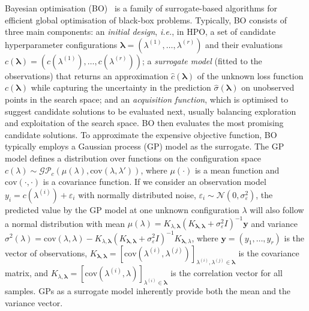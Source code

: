 Bayesian optimisation (BO)~\citep{Mockus12b,Garnett23,Frazier18b,Kushner62,Kushner64} is a family of surrogate-based algorithms for efficient global optimisation of black-box problems.
Typically, BO consists of three main components: an \emph{initial design}, \emph{i.e.}, in HPO, a set of candidate hyperparameter configurations $\boldsymbol{\lambda} = (\lambda^{(1)},\ldots, \lambda^{(r)})$ and their evaluations 
$c(\boldsymbol{\lambda}) = (c(\lambda^{(1)}),\ldots, c(\lambda^{(r)}))$; a \emph{surrogate model} (fitted to the 
observations) that returns an approximation $\hat{c}(\boldsymbol{\lambda})$ of the unknown loss function $c(\boldsymbol{\lambda})$ while capturing the uncertainty in the prediction $\hat{\sigma}(\boldsymbol{\lambda})$ on unobserved points in the search space; and an \emph{acquisition function}, which is optimised to suggest candidate solutions to be evaluated next, usually balancing exploration and exploitation of the search space.
BO then evaluates the most promising candidate solutions.
To approximate the expensive objective function, BO typically employs a Gaussian process (GP) model as the surrogate. The GP model defines a distribution over functions on the configuration space $c(\lambda)\sim\mathcal{GP}_c(\mu(\lambda),\text{cov}(\lambda,\lambda'))$, where 
$\mu(\cdot)$ 
is a mean function and 
$\text{cov}(\cdot,\cdot)$
is a covariance function. If we consider an observation model 
$y_i = c(\lambda^{(i)}) + \varepsilon_i$
with normally distributed noise, 
$\varepsilon_i\sim\mathcal{N}(0,\sigma^2_\varepsilon)$, 
the predicted value by the GP model at one unknown configuration 
$\lambda$ will also follow a normal distribution with mean 
$\mu(\lambda)=K_{\lambda,\boldsymbol{\lambda}}(K_{\boldsymbol{\lambda},\boldsymbol{\lambda}}+\sigma^2_\varepsilon I)^{-1}\boldsymbol{y}$ and variance $\sigma^2(\lambda)=\text{cov}(\lambda,\lambda)-K_{\lambda,\boldsymbol{\lambda}}(K_{\boldsymbol{\lambda},\boldsymbol{\lambda}}+\sigma^2_\varepsilon I)^{-1} K_{\boldsymbol{\lambda},\lambda}$, 
where $\boldsymbol{y}=(y_1,\ldots,y_r)$ is the vector of observations, $K_{\boldsymbol{\lambda},\boldsymbol{\lambda}}=[\text{cov}(\lambda^{(i)},\lambda^{(j)})]_{\lambda^{(i)},\lambda^{(j)}\in\boldsymbol{\lambda}}$ is the covariance matrix, and $K_{\lambda,\boldsymbol{\lambda}}=[\text{cov}(\lambda^{(i)},\lambda)]_{\lambda^{(i)}\in\boldsymbol{\lambda}}$ is the correlation vector for all samples.
GPs as a surrogate model inherently provide both the mean and the variance vector.

